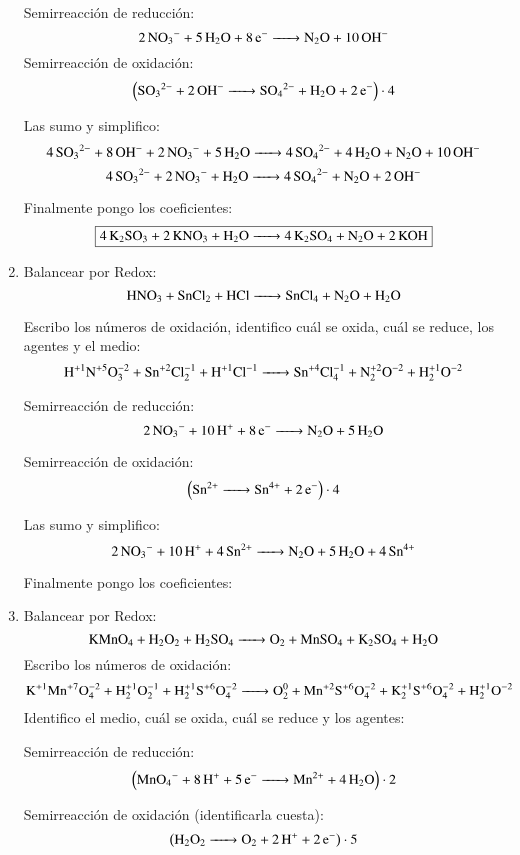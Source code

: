 \begin{enumerate}
\begin{multicols}{2}
Semirreacción de reducción:
$$\ce{
2NO_3^{-} + 5 H2O + 8e^- ->
N2O + 10OH^-
}$$
Semirreacción de oxidación:
$$\left(\ce{
SO3^{2-} + 2OH^- ->
SO4^{2-} + H2O + 2e^-
}\right)\cdot 4$$
\end{multicols}

Las sumo y simplifico:
$$\ce{
4SO3^{2-} + 8OH^- + 2NO_3^- + 5H2O ->
4SO_4^{2-} + 4 H2O + N2O + 10OH^-
}$$
$$\ce{
4SO3^{2-} + 2NO_3^- + H2O ->
4SO_4^{2-} + N2O + 2OH^-
}$$

Finalmente pongo los coeficientes:
$$\fbox{\ce{4K2SO3 + 2KNO3 + H2O ->
4K2SO4 + N2O + 2KOH}}$$

\item
Balancear por Redox:
$$\ce{
HNO3 + SnCl2 + HCl ->
SnCl4 + N2O + H2O
}$$

Escribo los números de oxidación, identifico cuál se oxida, cuál se reduce, los agentes y el medio:
$$\ce{
H^{+1}N^{+5}O^{-2}3 + Sn^{+2}Cl^{-1}2 + H^{+1}Cl^{-1} ->
Sn^{+4}Cl^{-1}4 + N^{+2}2O^{-2} + H^{+1}2O^{-2}
}$$


\begin{multicols}{2}
Semirreacción de reducción:
$$\ce{
2NO_3^- +10H^+ + 8e^- ->
N2O + 5H2O
}$$

Semirreacción de oxidación:
$$\left(\ce{
Sn^{2+} ->
Sn^{4+} + 2e^-
}\right)\cdot 4$$
\end{multicols}

Las sumo y simplifico:
$$\ce{
2NO_3^- + 10H^+ + 4Sn^{2+} ->
N2O + 5H2O + 4Sn^{4+}
}$$

Finalmente pongo los coeficientes:

\hfil{}\hfil


\item 
Balancear por Redox:
$$\ce{KMnO4 + H2O2 + H2SO4 -> O2 + MnSO4 + K2SO4 + H2O}$$
Escribo los números de oxidación:
$$\ce{
K^{+1}Mn^{+7}O^{-2}4 + H^{+1}2O^{-1}2 + H^{+1}2S^{+6}O^{-2}4 ->
O^{0}2 + Mn^{+2}S^{+6}O^{-2}4 + K^{+1}2S^{+6}O^{-2}4 + H^{+1}2O^{-2}
}$$
Identifico el medio, cuál se oxida, cuál se reduce y los agentes:

\vspace{0.5\baselineskip}
\begin{multicols}{2}
Semirreacción de reducción:
$$\left(\ce{
MnO4^- + 8H^+ + 5e^- ->
Mn^{2+} + 4H2O
}\right) \cdot 2$$

Semirreacción de oxidación (identificarla cuesta):
$$\left(\ce{
H2O2 ->
O2 + 2H^+ + 2e^-
}\right) \cdot 5$$
\end{multicols}
    

\end{enumerate}
